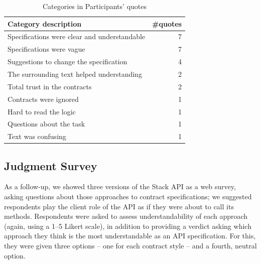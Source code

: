 \begin{table}
\centering
\caption{Categories in Participants' quotes}
\label{tab:categories}
\begin{tabular}{|l|r|} 
\hline
\textbf{Category description}                & \multicolumn{1}{l|}{\textbf{\#quotes}}  \\ 
\hline\hline
Specifications were clear and understandable & 7                                       \\ 
\hline
Specifications were vague                    & 7                                       \\ 
\hline
Suggestions to change the specification      & 4                                       \\ 
\hline
The surrounding text helped understanding    & 2                                       \\ 
\hline
Total trust in the contracts                 & 2                                       \\ 
\hline
Contracts were ignored                       & 1                                       \\ 
\hline
Hard to read the logic                       & 1                                       \\ 
\hline
Questions about the task                     & 1                                       \\ 
\hline
Text was confusing                           & 1                                       \\
\hline
\end{tabular}
\end{table}


\subsection{Judgment Survey}
\label{sec:surveyResults}

As a follow-up, we showed three versions of the Stack API as a web survey, asking questions about those approaches to contract specifications; we suggested respondents play the client role of the API as if they were about to call its methods.
Respondents were asked to assess understandability of each approach (again, using a 1--5 Likert scale), in addition to providing a verdict asking which approach they think is the most understandable as an API specification. For this, they were given three options -- one for each contract style -- and a fourth, neutral option.

